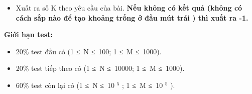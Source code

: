 \begin{itemize}
	\item     Xuất ra số K theo yêu cầu của bài.    \textbf{     Nếu không có kết quả (không có cách sắp nào để tạo khoảng trống ở đầu mút trái ) thì xuất ra -1.    }
\end{itemize}

\textbf{     Giới hạn test:    }
\begin{itemize}
	\item      20\% test đầu có (1 ≤ N ≤ 100; 1 ≤ M ≤ 1000).    
	\item      20\% test tiếp theo có           (1 ≤ N ≤ 10000; 1 ≤ M ≤ 1000).     
	\item        60\% test còn lại có (1 ≤ N ≤ 10       $^        5       $       ; 1 ≤ M ≤ 10       $^        5       $       ).      
\end{itemize}
\begin{itemize}
\end{itemize}

\
